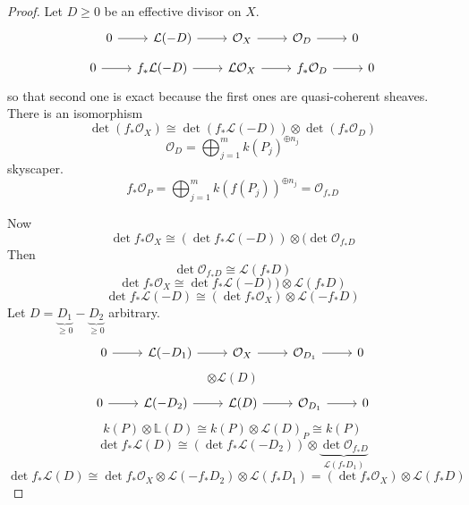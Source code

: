 \begin{proof}\leavevmode
	Let $D\geq 0$ be an effective divisor on $X$.
	\[\begin{tikzcd}0\arrow[r]&\mathcal{L}(-D)\arrow[r]&\mathcal{O}_X\arrow[r]&\mathcal{O}_D\arrow[r]&0\end{tikzcd}\]
	\[\begin{tikzcd}0\arrow[r]&f_* \mathcal{L}(-D)\arrow[r]&\mathcal{L}\mathcal{O}_X\arrow[r]&f_* \mathcal{O}_D\arrow[r]&0\end{tikzcd}\]
so that second one is exact because the first ones are quasi-coherent sheaves. There is an isomorphism
\[\det (f_* \mathcal{O}_X)\cong \det (f_* \mathcal{L}(-D))\otimes \det(f_* \mathcal{O}_D)\]
\[\mathcal{O}_D=\bigoplus_{j=1}^m k( P_j)^{\oplus n_j} \]
skyscaper.
\[f_* \mathcal{O}_P=\bigoplus_{j=1}^mk(f( P_j))^{\oplus n_j}=\mathcal{O}_{f_* D}\]

Now
\[\det f_* \mathcal{O}_X\cong (\det f_* \mathcal{L}(-D))\otimes(\det \mathcal{O}_{f_* D}\]
Then
\[\det \mathcal{O}_{f_* D}\cong \mathcal{L}(f_* D)\]
\[\det f_* \mathcal{O}_X\cong \det f_*\mathcal{L}(-D))\otimes\mathcal{L}(f_* D)\]
\[\det f_* \mathcal{L}(-D)\cong (\det f_* \mathcal{O}_X)\otimes\mathcal{L}(-f_* D)\]
Let $D=\underbrace{D_1}_{\geq 0}-\underbrace{D_2}_{\geq 0}$ arbitrary.
\[\begin{tikzcd}
	0\arrow[r]&\mathcal{L}(-D_1)\arrow[r]&\mathcal{O}_X\arrow[r]&\mathcal{O}_{D_1}\arrow[r]&0
\end{tikzcd}\]
\[\otimes\mathcal{L}(D)\]
\[\begin{tikzcd}
	0\arrow[r]&\mathcal{L}(-D_2)\arrow[r]&\mathcal{L}(D)\arrow[r]&\mathcal{O}_{D_1}\arrow[r]&0
\end{tikzcd}\]
\[k(P)\otimes\mathbb{L}(D)\cong k(P)\otimes\mathcal{L}(D)_P\cong k(P)\]
\[\det f_* \mathcal{L}(D)\cong (\det f_* \mathcal{L}(-D_2))\otimes\underbrace{\det \mathcal{O}_{f_* D}}_{\mathcal{L}(f_* D_1)}\]
\[\det f_* \mathcal{L}(D)\cong \det f_* \mathcal{O}_X\otimes\mathcal{L}(-f_* D_2)\otimes\mathcal{L}(f_* D_1)=(\det f_* \mathcal{O}_X)\otimes\mathcal{L}(f_* D)\]
\end{proof}

